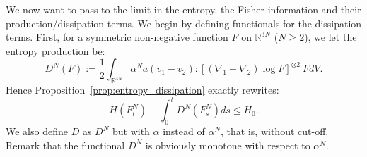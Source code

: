 \documentclass[11pt,a4paper]{article}
\theoremstyle{definition}
\theoremstyle{plain}
\begin{document}
We now want to pass to the limit in the entropy, the Fisher information and their production/dissipation terms. We begin by defining functionals for the dissipation terms. First, for a symmetric non-negative function $F$ on $\mathbb{R}^{3N}$ ($N\geq 2$), we let the entropy production be:
\begin{equation}
\label{eq:defDn}
    D^N(F):= \frac{1}{2}\int_{\mathbb{R}^{3N}} \alpha^N a(v_1-v_2):\left[(\nabla_1-\nabla_2)\log{F}\right]^{\otimes 2} \ F dV.
\end{equation}
Hence Proposition~\ref{prop:entropy_dissipation} exactly rewrites:
\begin{equation}
\label{eq:entropy_dissipation_rewrite}
    H(F^N_t)+\int_0^t D^N(F^N_s)ds \leq H_0.
\end{equation}
We also define $D$ as $D^N$ but with $\alpha$ instead of $\alpha^N$, that is, without cut-off. Remark that the functional $D^N$ is obviously monotone with respect to $\alpha^N$.
\end{document}

